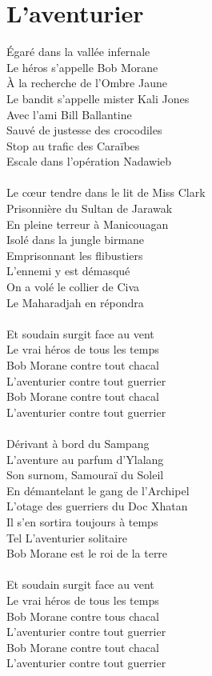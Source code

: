 \section*{L'aventurier}
Égaré dans la vallée infernale\\
Le héros s'appelle Bob Morane\\
À la recherche de l'Ombre Jaune\\
Le bandit s'appelle mister Kali Jones\\
Avec l'ami Bill Ballantine\\
Sauvé de justesse des crocodiles\\
Stop au trafic des Caraïbes\\
Escale dans l'opération Nadawieb\\\\
Le cœur tendre dans le lit de Miss Clark\\
Prisonnière du Sultan de Jarawak\\
En pleine terreur à Manicouagan\\
Isolé dans la jungle birmane\\
Emprisonnant les flibustiers\\
L'ennemi y est démasqué\\
On a volé le collier de Civa\\
Le Maharadjah en répondra\\\\
Et soudain surgit face au vent\\
Le vrai héros de tous les temps\\
Bob Morane contre tout chacal\\
L'aventurier contre tout guerrier\\
Bob Morane contre tout chacal\\
L'aventurier contre tout guerrier\\\\
Dérivant à bord du Sampang\\
L'aventure au parfum d'Ylalang\\
Son surnom, Samouraï du Soleil\\
En démantelant le gang de l'Archipel\\
L'otage des guerriers du Doc Xhatan\\
Il s'en sortira toujours à temps\\
Tel L'aventurier solitaire\\
Bob Morane est le roi de la terre\\\\
Et soudain surgit face au vent\\
Le vrai héros de tous les temps\\
Bob Morane contre tous chacal\\
L'aventurier contre tout guerrier\\
Bob Morane contre tout chacal\\
L'aventurier contre tout guerrier\\

